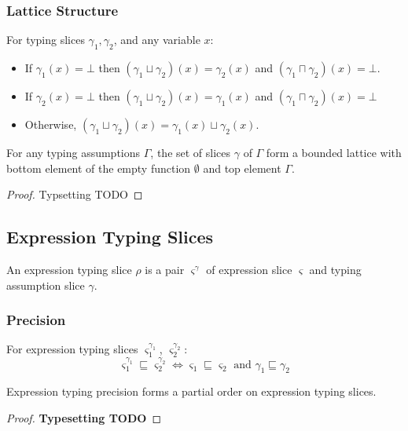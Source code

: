 \subsubsection{Lattice Structure}
\begin{definition}
For typing slices $\gamma_1, \gamma_2$, and any variable $x$:
\begin{itemize}
\item If $\gamma_1(x) = \bot$ then $(\gamma_1 \sqcup \gamma_2)(x) = \gamma_2(x)$ and $(\gamma_1 \sqcap \gamma_2)(x) = \bot$. 
\item If $\gamma_2(x) = \bot$ then $(\gamma_1 \sqcup \gamma_2)(x) = \gamma_1(x)$ and $(\gamma_1 \sqcap \gamma_2)(x) = \bot$
\item Otherwise, $(\gamma_1 \sqcup \gamma_2)(x) = \gamma_1(x) \sqcup \gamma_2(x)$.
\end{itemize}
\end{definition}

\begin{proposition}
For any typing assumptions $\Gamma$, the set of slices $\gamma$ of $\Gamma$ form a bounded lattice with bottom element of the empty function $\emptyset$ and top element $\Gamma$.
\end{proposition}
\begin{proof}
Typsetting TODO
\end{proof}
\subsection{Expression Typing Slices}
\begin{definition}
An expression typing slice $\rho$ is a pair $\varsigma^\gamma$ of expression slice $\varsigma$ and typing assumption slice $\gamma$.
\end{definition}

\subsubsection{Precision}
\begin{definition}
For expression typing slices $\varsigma_1^{\gamma_1}$, $\varsigma_2^{\gamma_2}$:
\[\varsigma_1^{\gamma_1} \sqsubseteq \varsigma_2^{\gamma_2} \iff  \varsigma_1 \sqsubseteq \varsigma_2 \text{ and } \gamma_1 \sqsubseteq \gamma_2\]
\end{definition}
\begin{proposition}
Expression typing precision forms a partial order on expression typing slices.
\end{proposition}
\begin{proof}
\textbf{Typesetting TODO}
\end{proof}
